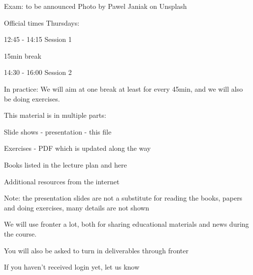 \documentclass[Screen16to9,17pt]{foils}
\begin{document}
Exam: to be announced {\hfill\small Photo by Pawel Janiak on Unsplash}


Official times Thursdays:
\begin{list2}
\item 12:45 - 14:15 Session 1\\

\item 15min break\\

\item  14:30 - 16:00 Session 2\\
\end{list2}

In practice:
We will aim at one break at least for every 45min, and we will also be doing exercises.



\begin{list1}
\item This material is in multiple parts:
\begin{list2}
\item Slide shows - presentation - this file
\item Exercises - PDF which is updated along the way
\end{list2}
\item Books listed in the lecture plan and here
\item Additional resources from the internet
\end{list1}

Note: the presentation slides are not a substitute for reading the books, papers and doing exercises, many details are not shown




We will use fronter a lot, both for sharing educational materials and news during the course.

You will also be asked to turn in deliverables through fronter


\vskip 5mm
\centerline{If you haven't received login yet, let us know}


\end{document}

